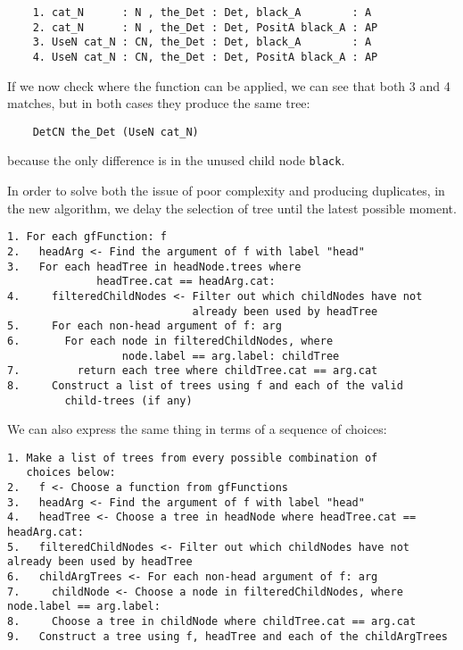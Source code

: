 \begin{verbatim}
    1. cat_N      : N , the_Det : Det, black_A        : A
    2. cat_N      : N , the_Det : Det, PositA black_A : AP
    3. UseN cat_N : CN, the_Det : Det, black_A        : A
    4. UseN cat_N : CN, the_Det : Det, PositA black_A : AP
\end{verbatim}

If we now check where the function can be applied, we can see that both 3 and 4 matches,
but in both cases they produce the same tree:
\begin{verbatim}
    DetCN the_Det (UseN cat_N)
\end{verbatim}
because the only difference is in the unused child node \verb|black|.

In order to solve both the issue of poor complexity and producing duplicates, in the new algorithm, we delay the selection of tree until the latest possible moment.




\begin{verbatim}
1. For each gfFunction: f
2.   headArg <- Find the argument of f with label "head"
3.   For each headTree in headNode.trees where
              headTree.cat == headArg.cat:
4.     filteredChildNodes <- Filter out which childNodes have not
                             already been used by headTree
5.     For each non-head argument of f: arg
6.       For each node in filteredChildNodes, where
                  node.label == arg.label: childTree
7.         return each tree where childTree.cat == arg.cat
8.     Construct a list of trees using f and each of the valid
         child-trees (if any)
\end{verbatim}

We can also express the same thing in terms of a sequence of choices:

\begin{verbatim}
1. Make a list of trees from every possible combination of
   choices below:
2.   f <- Choose a function from gfFunctions
3.   headArg <- Find the argument of f with label "head"
4.   headTree <- Choose a tree in headNode where headTree.cat == headArg.cat:
5.   filteredChildNodes <- Filter out which childNodes have not already been used by headTree
6.   childArgTrees <- For each non-head argument of f: arg
7.     childNode <- Choose a node in filteredChildNodes, where node.label == arg.label:
8.     Choose a tree in childNode where childTree.cat == arg.cat
9.   Construct a tree using f, headTree and each of the childArgTrees
\end{verbatim}

